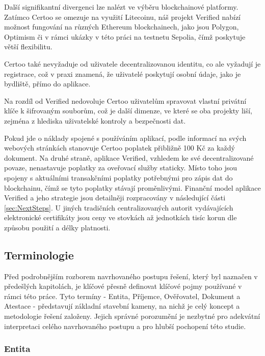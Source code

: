 Další signifikantní divergenci lze nalézt ve výběru blockchainové platformy. Zatímco Certoo se omezuje na využití Litecoinu, náš projekt Verified nabízí možnost fungování na různých Ethereum blockchainech, jako jsou Polygon, Optimism či v rámci ukázky v této práci na testnetu Sepolia, čímž poskytuje větší flexibilitu.

Certoo také nevyžaduje od uživatele decentralizovanou identitu, co ale vyžadují je registrace, což v praxi znamená, že uživatelé poskytují osobní údaje, jako je bydliště, přímo do aplikace.

Na rozdíl od Verified nedovoluje Certoo uživatelům spravovat vlastní privátní klíče k šifrovaným souborům, což je další dimenze, ve které se oba projekty liší, zejména z hlediska uživatelské kontroly a bezpečnosti dat.

Pokud jde o náklady spojené s používáním aplikací, podle informací na svých webových stránkách stanovuje Certoo poplatek přibližně 100 Kč za každý dokument. Na druhé straně, aplikace Verified, vzhledem ke své decentralizované povaze, nenastavuje poplatky za oveřovací služby staticky. Místo toho jsou spojeny s aktuálními transakčními poplatky potřebnými pro zápis dat do blockchainu, čímž se tyto poplatky stávají proměnlivými. Finanční model aplikace Verified a jeho strategie jsou detailněji rozpracovány v následující části \ref{sec:NextSteps}. U jiných tradičních centralizovaných autorit vydávajících elektronické certifikáty jsou ceny ve stovkách až jednotkách tisíc korun dle způsobu použití a délky platnosti. \cite{CeskaPosta} \cite{Certoo}


\subsection{Terminologie}


Před podrobnějším rozborem navrhovaného postupu řešení, který byl naznačen v předešlých kapitolách, je klíčové přesně definovat klíčové pojmy používané v rámci této práce. Tyto termíny - Entita, Příjemce, Ověřovatel, Dokument a Atestace - představují základní stavební kameny, na nichž je celý koncept a metodologie řešení založeny. Jejich správné porozumění je nezbytné pro adekvátní interpretaci celého navrhovaného postupu a pro hlubší pochopení této studie.




\subsubsection{Entita}

